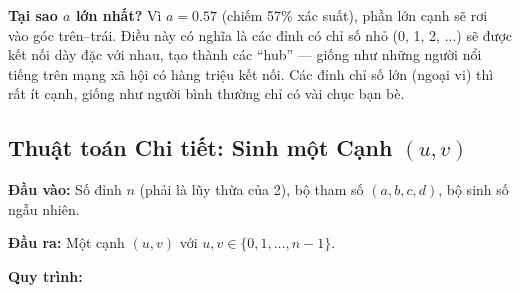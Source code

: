 \documentclass[12pt,a4paper]{article}
\begin{document}
\begin{explain}
\textbf{Tại sao $a$ lớn nhất?} Vì $a = 0.57$ (chiếm 57\% xác suất), phần lớn cạnh sẽ rơi vào góc trên--trái. Điều này có nghĩa là các đỉnh có chỉ số nhỏ (0, 1, 2, ...) sẽ được kết nối dày đặc với nhau, tạo thành các ``hub'' --- giống như những người nổi tiếng trên mạng xã hội có hàng triệu kết nối. Các đỉnh chỉ số lớn (ngoại vi) thì rất ít cạnh, giống như người bình thường chỉ có vài chục bạn bè.
\end{explain}

\subsection{Thuật toán Chi tiết: Sinh một Cạnh $(u, v)$}

\textbf{Đầu vào:} Số đỉnh $n$ (phải là lũy thừa của 2), bộ tham số $(a, b, c, d)$, bộ sinh số ngẫu nhiên.

\textbf{Đầu ra:} Một cạnh $(u, v)$ với $u, v \in \{0, 1, \ldots, n-1\}$.

\textbf{Quy trình:}
\end{document}
